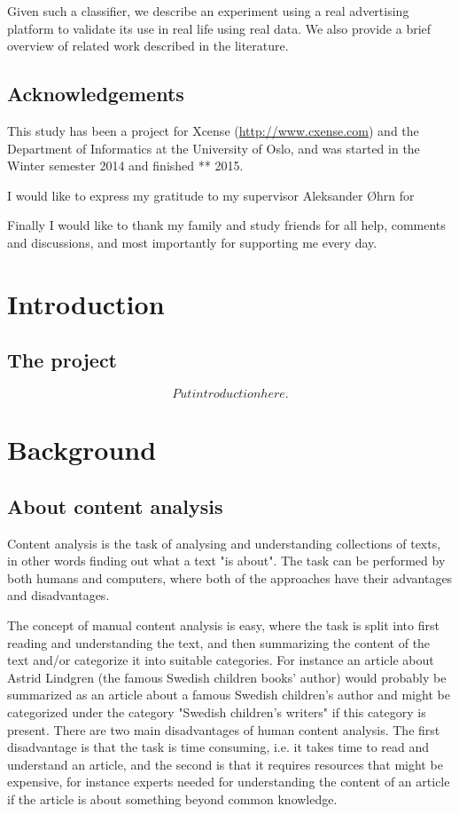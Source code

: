 \documentclass[english,a4paper]{ifimaster}
\begin{document}
Given such a classifier, we describe an experiment using a real advertising platform to validate its use in real life using real data. We also provide a brief overview of related work described in the literature.

\tableofcontents{}
\listoffigures{}
\listoftables{}

\chapter*{Acknowledgements}
This study has been a project for Xcense (\url{http://www.cxense.com}) and the Department of Informatics at the University of Oslo, and was started in the Winter semester  2014 and finished ** 2015. 

I would like to express my gratitude to my supervisor Aleksander Øhrn for 

Finally I would like to thank my family and study friends for all help, comments and discussions, and most importantly for supporting me every day.  
\mainmatter{}

\part{Introduction}
\chapter{The project}

\[ Put introduction here. \]
\part{Background}
\chapter{About content analysis}
Content analysis is the task of analysing and understanding collections of texts, in other words finding out what a text "is about". The task can be performed by both humans and computers, where both of the approaches have their advantages and disadvantages.

The concept of manual content analysis is easy, where the task is split into first reading and understanding the text, and then summarizing the content of the text and/or categorize it into suitable categories. For instance an article about Astrid Lindgren (the famous Swedish children books' author) would probably be summarized as an article about a famous Swedish children's author and might be categorized under the category "Swedish children's writers" if this category is present.  
There are two main disadvantages of human content analysis. The first disadvantage is that the task is time consuming, i.e. it takes time to read and understand an article, and the second is that it requires resources that might be expensive, for instance experts needed for understanding the content of an article if the article is about something beyond common knowledge.
\end{document}
